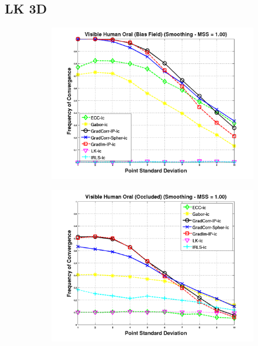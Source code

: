 \subsection{LK 3D}\label{subsec:lk3d-results}
\begin{figure}[t!]
        \centering
        \begin{subfigure}{0.3\textwidth}
                \centering
                \includegraphics[width=\textwidth]{images/results/biasfield}
                \subcaption{}
                \label{fig:results-biasfield}
        \end{subfigure}
        \begin{subfigure}{0.3\textwidth}
                \centering
                \includegraphics[width=\textwidth]{images/results/occlusion}

\end{subfigure}
\end{figure}
